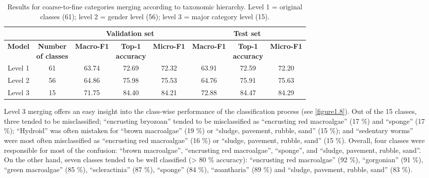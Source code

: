 \begin{table}[htbp]
  \centering
  \normalsize
  \caption[Results for coarse-to-fine categories merging according to taxonomic hierarchy]{Results for coarse-to-fine categories merging according to taxonomic hierarchy. Level 1 = original classes (61); level 2 = gender level (56); level 3 = major category level (15).}
  \label{table1.6}
  \begin{tabular}{*{2}{c}|*{3}{c}|*{3}{c}}
        \toprule
        \multicolumn{2}{c}{\textbf{}}               & \multicolumn{3}{c}{\textbf{Validation set}}                     & \multicolumn{3}{c}{\textbf{Test set}}                           \\ \midrule
        \textbf{Model} & \makecell{\textbf{Number} \\ \textbf{of classes}} & \textbf{Macro-F1} & \makecell{\textbf{Top-1} \\ \textbf{accuracy}} & \textbf{Micro-F1} & \textbf{Macro-F1} & \makecell{\textbf{Top-1} \\ \textbf{accuracy}} & \textbf{Micro-F1} \\
        \midrule
        Level 1        & 61                         & 63.74             & 72.69                   & 72.32             & 63.91             & 72.59                   & 72.20             \\
        Level 2        & 56                         & 64.86             & 75.98                   & 75.53             & 64.76             & 75.91                   & 75.63             \\
        Level 3        & 15                         & 71.75             & 84.40                   & 84.21             & 72.88             & 84.47                   & 84.29             \\ \bottomrule
    \end{tabular}
\end{table}

Level 3 merging offers an easy insight into the class-wise performance of the classification process (see \autoref{figure1.8}). Out of the 15 classes, three tended to be misclassified; “encrusting bryozoan” tended to be misclassified as “encrusting red macroalgae” (17 \%) and “sponge” (17 \%); “Hydroid” was often mistaken for “brown macroalgae” (19 \%) or “sludge, pavement, rubble, sand” (15 \%); and “sedentary worms” were most often misclassified as “encrusting red macroalgae” (16 \%) or “sludge, pavement, rubble, sand” (15 \%). Overall, four classes were responsible for most of the confusion: “brown macroalgae”, “encrusting red macroalgae”, “sponge”, and “sludge, pavement, rubble, sand”. On the other hand, seven classes tended to be well classified (> 80 \% accuracy): “encrusting red macroalgae” (92 \%), “gorgonian” (91 \%), “green macroalgae” (85 \%), “scleractinia” (87 \%), “sponge” (84 \%), “zoantharia” (89 \%) and “sludge, pavement, rubble, sand” (83 \%).

